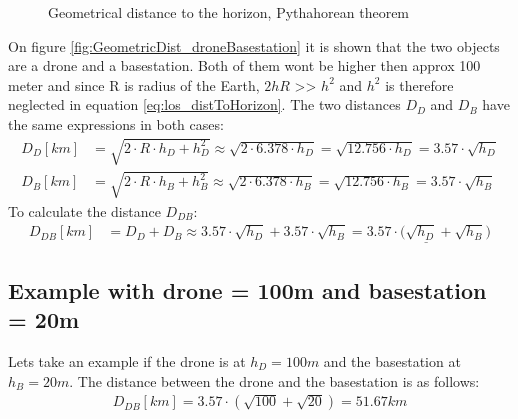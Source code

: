 \begin{figure}%
    \centering
    \qquad
    \caption{Geometrical distance to the horizon, Pythahorean theorem}%
    \label{fig:GeometricDistanceToHorizon}%
\end{figure}

On figure \ref{fig:GeometricDist_droneBasestation} it is shown that the two objects are a drone and a basestation. Both of them wont be higher then approx 100 meter and since R is radius of the Earth, $2hR$ >> $h^2$ and $h^2$ is therefore neglected in equation \ref{eq:los_distToHorizon}. The two distances $D_D$ and $D_B$ have the same expressions in both cases:
\begin{align}
D_D [km] &= \sqrt{2\cdot R \cdot h_D + h_{D}^2} \approx \sqrt{2\cdot 6.378\cdot h_D} = \sqrt{12.756\cdot h_D} = 3.57\cdot \sqrt{h_D} \\
D_B [km] &= \sqrt{2\cdot R \cdot h_B + h_{B}^2} \approx \sqrt{2\cdot 6.378\cdot h_B} = \sqrt{12.756\cdot h_B} = 3.57\cdot \sqrt{h_B}
\end{align}
To calculate the distance $D_{DB}$:
\begin{align}
D_{DB}[km] &= D_D + D_B \approx 3.57\cdot \sqrt{h_D} + 3.57\cdot \sqrt{h_B} = \underline{3.57\cdot (\sqrt{h_D} + \sqrt{h_B}} )
\end{align}

\subsection{Example with drone = 100m and basestation = 20m}
Lets take an example if the drone is at $h_D = 100m$ and the basestation at $h_B = 20m$. The distance between the drone and the basestation is as follows:
\begin{align}
D_{DB}[km] = 3.57\cdot (\sqrt{100} + \sqrt{20}) = 51.67km
\end{align}
